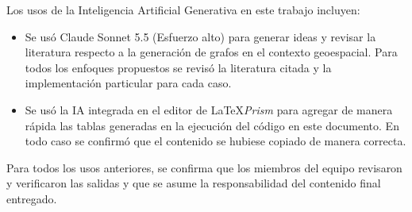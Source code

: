 \documentclass[11pt]{article}
\begin{document}
Los usos de la Inteligencia Artificial Generativa en este trabajo incluyen:

\begin{itemize}
    \item Se usó Claude Sonnet 5.5 (Esfuerzo alto) para generar ideas y revisar la literatura respecto a la generación de grafos en el contexto geoespacial. Para todos los enfoques propuestos se revisó la literatura citada y la implementación particular para cada caso.
    \item Se usó la IA integrada en el editor de \LaTeX \textit{Prism} para agregar de manera rápida las tablas generadas en la ejecución del código en este documento. En todo caso se confirmó que el contenido se hubiese copiado de manera correcta.
\end{itemize}

Para todos los usos anteriores, se confirma que los miembros del equipo revisaron y verificaron las salidas y que se asume la responsabilidad del contenido final entregado.

\pagebreak

\nocite{*}


\end{document}
